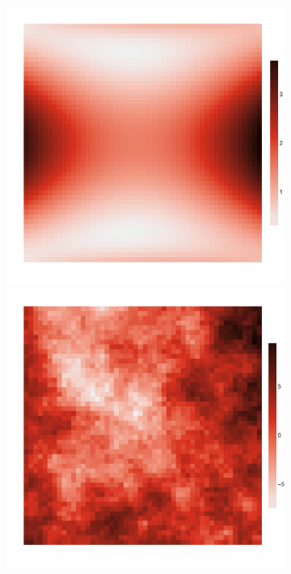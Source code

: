 \documentclass{article}
\begin{document}
\begin{figure}
	\centering
	\begin{subfigure}{0.3\textwidth}
		\includegraphics[width=\linewidth]{figures/y110}\\
		\includegraphics[width=\linewidth]{figures/y111}\\

\end{subfigure}
\end{figure}
\end{document}

